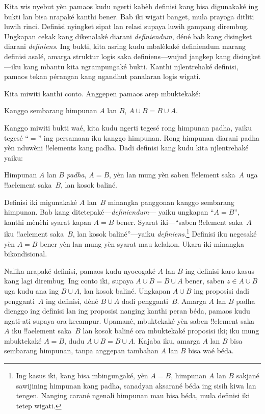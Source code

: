 \documentclass[../../../include/open-logic-section]{subfiles}
\begin{document}
%


Kita wis nyebut yèn pamaos kudu ngerti kabèh definisi kang
bisa digunakaké ing bukti lan bisa nrapaké kanthi bener. Bab iki
wigati banget, mula prayoga ditliti luwih rinci. Definisi
nyingket sipat lan relasi supaya luwih gampang dirembug. Ungkapan
cekak kang dikenalaké diarani \emph{definiendum}, déné bab kang
disingket diarani \emph{definiens}. Ing bukti, kita asring kudu
mbalèkaké definiendum marang definisi asalé, amarga struktur
logis saka definiens---wujud jangkep kang disingket---iku kang
mbantu kita ngrampungaké bukti. Kanthi njlentrehaké definisi,
pamaos tekan pérangan kang ngandhut panalaran logis wigati.

Kita miwiti kanthi conto. Anggepen pamaos arep mbuktekaké:

\begin{prop}
Kanggo sembarang himpunan $A$ lan $B$, $A \cup B = B \cup A$.
\end{prop}

Kanggo miwiti bukti waé, kita kudu ngerti tegesé rong himpunan
padha, yaiku tegesé ``$=$'' ing persamaan iku kanggo himpunan.
Rong himpunan diarani padha yèn nduwèni !!{element}s kang padha.
Dadi definisi kang
kudu kita njlentrehaké yaiku:

\begin{defn}
Himpunan $A$ lan $B$ \emph{padha}, $A = B$, yèn lan mung yèn
saben !!{element} saka~$A$ uga !!a{element} saka~$B$, lan kosok baliné.
\end{defn}

Definisi iki migunakaké $A$ lan~$B$ minangka panggonan kanggo
sembarang himpunan. Bab kang ditetepaké---\emph{definiendum}---
yaiku ungkapan ``$A = B$'', kanthi mènèhi syarat kapan $A = B$
bener. Syarat iki---``saben !!{element} saka~$A$ iku
!!a{element} saka~$B$, lan kosok baliné''---yaiku
\emph{definiens}.\footnote{Ing kasus iki, kang bisa mbingungaké,
yèn $A = B$, himpunan $A$ lan $B$ sakjané sawijining himpunan
kang padha, sanadyan aksarané béda ing sisih kiwa lan tengen.
Nanging carané ngenali himpunan mau bisa béda, mula definisi
iki tetep wigati.} Definisi iku negesaké yèn $A = B$ bener yèn
lan mung yèn syarat mau kelakon. Ukara iki minangka bikondisional.

Nalika nrapaké definisi, pamaos kudu nyocogaké $A$ lan $B$
ing definisi karo kasus kang lagi dirembug. Ing conto iki,
supaya $A \cup B = B \cup A$ bener, saben $z \in A \cup B$
uga kudu ana ing $B \cup A$, lan kosok baliné. Ungkapan $A \cup
B$ ing proposisi dadi pengganti~$A$ ing definisi, déné
$B \cup A$ dadi pengganti~$B$. Amarga $A$ lan $B$ padha dienggo
ing definisi lan ing proposisi nanging kanthi peran béda,
pamaos kudu ngati-ati supaya ora kecampur. Upamané,
mbuktekaké yèn saben !!{element} saka~$A$ iku !!a{element}
saka~$B$ lan kosok baliné ora mbuktekaké proposisi iki;
iku mung mbuktekaké $A = B$, dudu $A \cup B = B \cup A$.
Kajaba iku, amarga $A$ lan $B$ bisa sembarang himpunan,
tanpa anggepan tambahan $A$ lan $B$ bisa waé béda.
\end{document}
